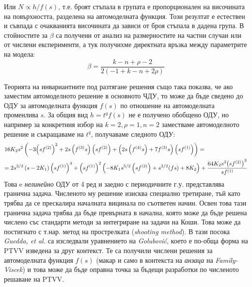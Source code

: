 Или $N \propto h/f(s)$, т.е. броят стъпала в групата е пропорционален на височината на повърхността, разделена на автомоделната функция. Този резултат е естествен и съвпада с очакванията височината да зависи от броя стъпала в дадена група. В \cite{Kozlov2022} стойностите за $\beta$ са получени от анализ на размерностите на частни случаи или от числени експерименти, а тук получихме директната връзка между параметрите на модела:
\begin{equation}
    \beta = \frac{{k - n + \rho  - 2}}{{2\left( { - 1 + k - n + 2\rho } \right)}}
    \label{eq:beta_explicit}
\end{equation}

Теорията на инвариантните под разтягане решения също така показва, че ако заместим автомоделното решение в основното ЧДУ, то може да бъде сведено до ОДУ за автомоделната функция $f(s)$ по отношение на автомоделната променлива $s$. За общия вид $h  = t^q f(s)$ не е получено обобщено ОДУ, но например за конкретния избор на  $k = 2, \rho  = 1, n = 2$ заместваме автомоделното решение и съкращаваме на $t^q$, получаваме следното ОДУ:
\[\begin{gathered}
  16{K_2}{s^2}\left( { - 3{{\left( {s{f^{(2)}}} \right)}^2} + 2s\left( {{f^{(3)}}s} \right)\left( {s{f^{(2)}}} \right) + \left( {2s\left( {{f^{(4)}}s} \right) + 7{f^{(3)}}s} \right)\left( {s{f^{(1)}}} \right)} \right) =  \hfill \\
   = 2{s^{3/2}}\left( {s - 2{K_1}} \right){\left( {s{f^{(1)}}} \right)^3} + {\left( {s{f^{(1)}}} \right)^2}\left( { - 8{K_1}{s^{5/2}}\left( {s{f^{(2)}}} \right) + {s^{3/2}}(fs) + 8{K_2}} \right) + \frac{{64{K_2}{s^3}{{\left( {s{f^{(2)}}} \right)}^3}}}{{s{f^{(1)}}}} \hfill \\ 
\end{gathered} \]
Това e \textit{нелинейно} ОДУ от 4 ред и заедно с периодичните г.у. представлява гранична задача. Численото му решение изисква специално третиране, тъй като трябва да се прескалира началната вицинала по съответен начин. Освен това тази гранична задача трябва да бъде превърната в начална, която може да бъде решена числено със стандарти методи за интегриране на задачи на Коши. Това може да постигнато с т.нар. метод на прострелката (\textit{shooting method}). В тази посока \textit{Guedda, et al.} \cite{Guedda2022} са изследвали уравнението на \textit{Golubović}, което е по-обща форма на PTVV изведена за друг контекст. Те са получили числени решения за автомоделната функция $f(s)$ (макар и само в контекста на \textit{анзаца} на \textit{Family-Viscek}) и това може да бъде оправна точка за бъдещи разработки по численото решаване на PTVV.